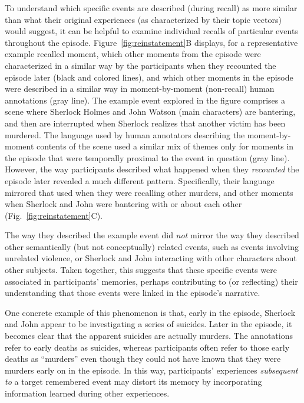 \documentclass{article}
\begin{document}
To understand which specific events are described (during recall) as more similar than what their original experiences (as characterized by their topic vectors) would suggest, it can be helpful to examine individual recalls of particular events throughout the episode.  Figure~\ref{fig:reinstatement}B displays, for a representative example recalled moment, which other moments from the episode were characterized in a similar way by the participants when they recounted the episode later (black and colored lines), and which other moments in the episode were described in a similar way in moment-by-moment (non-recall) human annotations (gray line).  The example event explored in the figure comprises a scene where Sherlock Holmes and John Watson (main characters) are bantering, and then are interrupted when Sherlock realizes that another victim has been murdered.  The language used by human annotators describing the moment-by-moment contents of the scene used a similar mix of themes only for moments in the episode that were temporally proximal to the event in question (gray line).  However, the way participants described what happened when they \textit{recounted} the episode later revealed a much different pattern.  Specifically, their language mirrored that used when they were recalling other murders, and other moments when Sherlock and John were bantering with or about each other (Fig.~\ref{fig:reinstatement}C).

The way they described the example event did \textit{not} mirror the way they described other semantically (but not conceptually) related events, such as events involving unrelated violence, or Sherlock and John interacting with other characters about other subjects.  Taken together, this suggests that these specific events were associated in participants' memories, perhaps contributing to (or reflecting) their understanding that those events were linked in the episode's narrative.

One concrete example of this phenomenon is that, early in the episode, Sherlock and John appear to be investigating a series of suicides.  Later in the episode, it becomes clear that the apparent suicides are actually murders.  The annotations refer to early deaths as suicides, whereas participants often refer to those early deaths as ``murders'' even though they could not have known that they were murders early on in the episode.  In this way, participants' experiences \textit{subsequent to} a target remembered event may distort its memory by incorporating information learned during other experiences.
\end{document}
